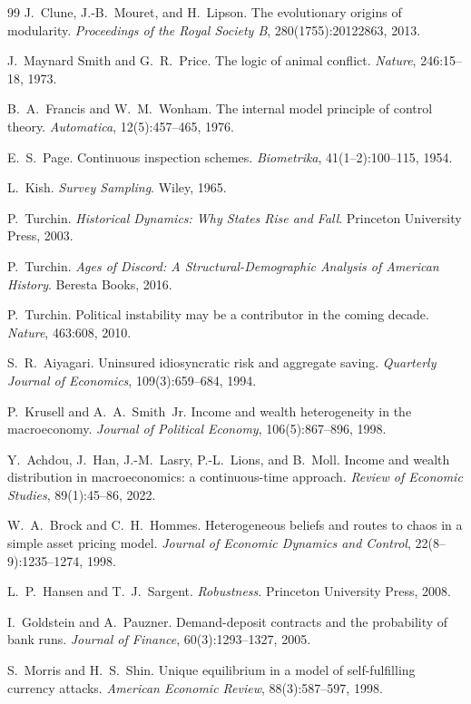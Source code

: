 \documentclass[11pt]{article}
\begin{document}
\begin{thebibliography}{99}
 J.~Clune, J.-B.~Mouret, and H.~Lipson. The evolutionary origins of modularity. \emph{Proceedings of the Royal Society B}, 280(1755):20122863, 2013.

 J.~Maynard Smith and G.~R.~Price. The logic of animal conflict. \emph{Nature}, 246:15--18, 1973.

 B.~A.~Francis and W.~M.~Wonham. The internal model principle of control theory. \emph{Automatica}, 12(5):457--465, 1976.

 E.~S.~Page. Continuous inspection schemes. \emph{Biometrika}, 41(1--2):100--115, 1954.

 L.~Kish. \emph{Survey Sampling}. Wiley, 1965.

 P.~Turchin. \emph{Historical Dynamics: Why States Rise and Fall}. Princeton University Press, 2003.

 P.~Turchin. \emph{Ages of Discord: A Structural-Demographic Analysis of American History}. Beresta Books, 2016.

 P.~Turchin. Political instability may be a contributor in the coming decade. \emph{Nature}, 463:608, 2010.

 S.~R.~Aiyagari. Uninsured idiosyncratic risk and aggregate saving. \emph{Quarterly Journal of Economics}, 109(3):659--684, 1994.

 P.~Krusell and A.~A.~Smith~Jr. Income and wealth heterogeneity in the macroeconomy. \emph{Journal of Political Economy}, 106(5):867--896, 1998.

 Y.~Achdou, J.~Han, J.-M.~Lasry, P.-L.~Lions, and B.~Moll. Income and wealth distribution in macroeconomics: a continuous-time approach. \emph{Review of Economic Studies}, 89(1):45--86, 2022.

 W.~A.~Brock and C.~H.~Hommes. Heterogeneous beliefs and routes to chaos in a simple asset pricing model. \emph{Journal of Economic Dynamics and Control}, 22(8--9):1235--1274, 1998.

 L.~P.~Hansen and T.~J.~Sargent. \emph{Robustness}. Princeton University Press, 2008.

 I.~Goldstein and A.~Pauzner. Demand-deposit contracts and the probability of bank runs. \emph{Journal of Finance}, 60(3):1293--1327, 2005.

 S.~Morris and H.~S.~Shin. Unique equilibrium in a model of self-fulfilling currency attacks. \emph{American Economic Review}, 88(3):587--597, 1998.


\end{thebibliography}
\end{document}
